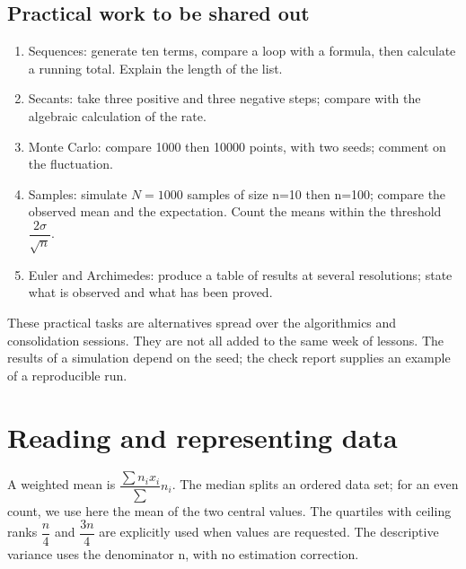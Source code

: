 \subsection*{Practical work to be shared out}\label{TP}
\begin{enumerate}
\item Sequences: generate ten terms, compare a loop with a formula, then calculate a running total. Explain the length of the list.
\item Secants: take three positive and three negative steps; compare with the algebraic calculation of the rate.
\item Monte Carlo: compare \num{1000} then \num{10000} points, with two seeds; comment on the fluctuation.
\item Samples: simulate $N=\num{1000}$ samples of size n=10 then n=100; compare the observed mean and the expectation. Count the means within the threshold $\dfrac{2\sigma}{\sqrt n}$.
\item Euler and Archimedes: produce a table of results at several resolutions; state what is observed and what has been proved.
\end{enumerate}
These practical tasks are alternatives spread over the algorithmics and consolidation sessions. They are not all added to the same week of lessons. The results of a simulation depend on the seed; the check report supplies an example of a reproducible run.

\section{Reading and representing data}\label{STATS}
A weighted mean is $\dfrac{\sum n_ix_i}{\sum}n_i$. The median splits an ordered data set; for an even count, we use here the mean of the two central values. The quartiles with ceiling ranks $\dfrac{n}{4}$ and $\dfrac{3n}{4}$ are explicitly used when values are requested. The descriptive variance uses the denominator n, with no estimation correction.

